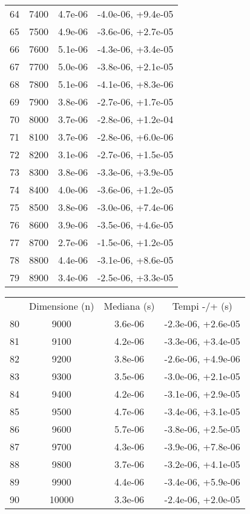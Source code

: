 \begin{table}
\begin{adjustbox}{width=1\textwidth/2}
\begin{tabular}{|c|c|c|c|}
\cline{1-4}
64 & 7400 & 4.7e-06 & -4.0e-06, +9.4e-05 \\
\cline{1-4}
65 & 7500 & 4.9e-06 & -3.6e-06, +2.7e-05 \\
\cline{1-4}
66 & 7600 & 5.1e-06 & -4.3e-06, +3.4e-05 \\
\cline{1-4}
67 & 7700 & 5.0e-06 & -3.8e-06, +2.1e-05 \\
\cline{1-4}
68 & 7800 & 5.1e-06 & -4.1e-06, +8.3e-06 \\
\cline{1-4}
69 & 7900 & 3.8e-06 & -2.7e-06, +1.7e-05 \\
\cline{1-4}
70 & 8000 & 3.7e-06 & -2.8e-06, +1.2e-04 \\
\cline{1-4}
71 & 8100 & 3.7e-06 & -2.8e-06, +6.0e-06 \\
\cline{1-4}
72 & 8200 & 3.1e-06 & -2.7e-06, +1.5e-05 \\
\cline{1-4}
73 & 8300 & 3.8e-06 & -3.3e-06, +3.9e-05 \\
\cline{1-4}
74 & 8400 & 4.0e-06 & -3.6e-06, +1.2e-05 \\
\cline{1-4}
75 & 8500 & 3.8e-06 & -3.0e-06, +7.4e-06 \\
\cline{1-4}
76 & 8600 & 3.9e-06 & -3.5e-06, +4.6e-05 \\
\cline{1-4}
77 & 8700 & 2.7e-06 & -1.5e-06, +1.2e-05 \\
\cline{1-4}
78 & 8800 & 4.4e-06 & -3.1e-06, +8.6e-05 \\
\cline{1-4}
79 & 8900 & 3.4e-06 & -2.5e-06, +3.3e-05 \\
\cline{1-4}
\end{tabular}
\end{adjustbox}
\end{table}

\begin{table}
\centering
\begin{adjustbox}{width=1\textwidth/2}
\begin{tabular}{|c|c|c|c|}
\hline
 & Dimensione (n) & Mediana (s) & Tempi -/+ (s) \\
80 & 9000 & 3.6e-06 & -2.3e-06, +2.6e-05 \\
\cline{1-4}
81 & 9100 & 4.2e-06 & -3.3e-06, +3.4e-05 \\
\cline{1-4}
82 & 9200 & 3.8e-06 & -2.6e-06, +4.9e-06 \\
\cline{1-4}
83 & 9300 & 3.5e-06 & -3.0e-06, +2.1e-05 \\
\cline{1-4}
84 & 9400 & 4.2e-06 & -3.1e-06, +2.9e-05 \\
\cline{1-4}
85 & 9500 & 4.7e-06 & -3.4e-06, +3.1e-05 \\
\cline{1-4}
86 & 9600 & 5.7e-06 & -3.8e-06, +2.5e-05 \\
\cline{1-4}
87 & 9700 & 4.3e-06 & -3.9e-06, +7.8e-06 \\
\cline{1-4}
88 & 9800 & 3.7e-06 & -3.2e-06, +4.1e-05 \\
\cline{1-4}
89 & 9900 & 4.4e-06 & -3.4e-06, +5.9e-06 \\
\cline{1-4}
90 & 10000 & 3.3e-06 & -2.4e-06, +2.0e-05 \\
\cline{1-4}
\end{tabular}
\end{adjustbox}
\end{table}


